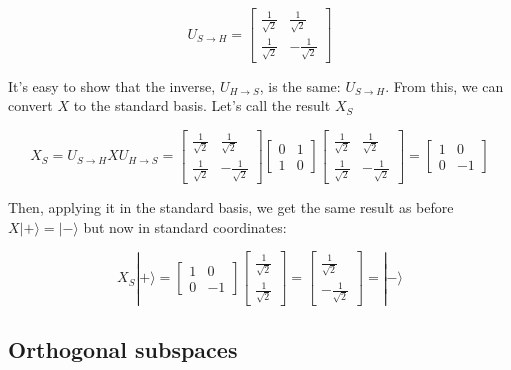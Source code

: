 \documentclass[main.tex]{subfiles}
\begin{document}
    $$
    U_{S \rightarrow H}=\left[\begin{array}{cc}
    \frac{1}{\sqrt{2}} & \frac{1}{\sqrt{2}} \\
    \frac{1}{\sqrt{2}} & -\frac{1}{\sqrt{2}}
    \end{array}\right]
    $$
    
    It's easy to show that the inverse, $U_{H \rightarrow S}$, is the same: $U_{S \rightarrow H}$. From this, we can convert $X$ to the standard basis. Let's call the result $X_{S}$
    
    $$
    X_{S}=U_{S \rightarrow H} X U_{H \rightarrow S}=\left[\begin{array}{cc}
    \frac{1}{\sqrt{2}} & \frac{1}{\sqrt{2}} \\
    \frac{1}{\sqrt{2}} & -\frac{1}{\sqrt{2}}
    \end{array}\right]\left[\begin{array}{ll}
    0 & 1 \\
    1 & 0
    \end{array}\right]\left[\begin{array}{cc}
    \frac{1}{\sqrt{2}} & \frac{1}{\sqrt{2}} \\
    \frac{1}{\sqrt{2}} & -\frac{1}{\sqrt{2}}
    \end{array}\right]=\left[\begin{array}{cc}
    1 & 0 \\
    0 & -1
    \end{array}\right]
    $$
    
    Then, applying it in the standard basis, we get the same result as before $X|+\rangle=|-\rangle$ but now in standard coordinates:
    
    $$
    X_{S}|+\rangle=\left[\begin{array}{cc}
    1 & 0 \\
    0 & -1
    \end{array}\right]\left[\begin{array}{c}
    \frac{1}{\sqrt{2}} \\
    \frac{1}{\sqrt{2}}
    \end{array}\right]=\left[\begin{array}{c}
    \frac{1}{\sqrt{2}} \\
    -\frac{1}{\sqrt{2}}
    \end{array}\right]=|-\rangle
    $$

\subsection{Orthogonal subspaces}
\end{document}
